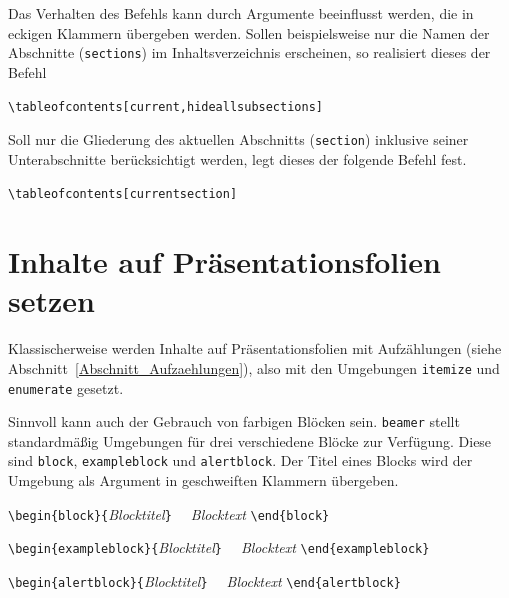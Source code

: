 \documentclass[a4paper,10pt,twoside]{scrbook}
\begin{document}
Das Verhalten des Befehls kann durch Argumente beeinflusst werden, die in eckigen Klammern übergeben werden.
Sollen beispielsweise nur die Namen der Abschnitte (\verb|sections|) im Inhaltsverzeichnis erscheinen, so realisiert dieses 
der Befehl 

\verb|\tableofcontents[current,hideallsubsections]|

Soll nur die Gliederung des aktuellen Abschnitts (\verb|section|) inklusive seiner Unterabschnitte berücksichtigt werden, 
legt dieses der folgende Befehl fest.

\verb|\tableofcontents[currentsection]|

\section{Inhalte auf Präsentationsfolien setzen}

Klassischerweise werden Inhalte auf Präsentationsfolien mit 
Aufzählungen (siehe Abschnitt~\ref{Abschnitt_Aufzaehlungen}), also mit den Umgebungen \verb!itemize! und \verb!enumerate! gesetzt. 

Sinnvoll kann auch der Gebrauch von farbigen Blöcken sein.
\verb|beamer| stellt standardmäßig Umgebungen für drei verschiedene Blöcke zur Verfügung. Diese sind
\verb|block|, 
\verb|exampleblock| und 
\verb|alertblock|. Der Titel eines Blocks 
wird der Umgebung als Argument in geschweiften Klammern übergeben.


\begin{boxedminipage}{\textwidth}
	\verb!\begin{block}{!\textsl{Blocktitel}\verb!}! \newline
	\verb!  !\textsl{Blocktext} \newline
	\verb!\end{block}! \\\enskip
	
	\verb!\begin{exampleblock}{!\textsl{Blocktitel}\verb!}! \newline
    \verb!  !\textsl{Blocktext} \newline
    \verb!\end{exampleblock}! \\\enskip

	\verb!\begin{alertblock}{!\textsl{Blocktitel}\verb!}! \newline
    \verb!  !\textsl{Blocktext} \newline
    \verb!\end{alertblock}!
\end{boxedminipage}
\end{document}
